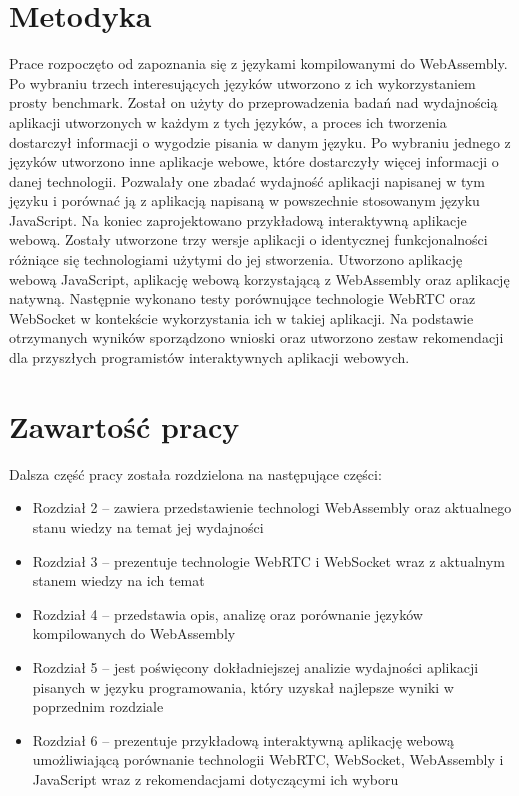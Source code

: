 \documentclass[language=polish,type=master]{aghmodern}
\begin{document}
\section{Metodyka}
Prace rozpoczęto od zapoznania się z językami kompilowanymi do WebAssembly.
Po wybraniu trzech interesujących języków utworzono z ich wykorzystaniem prosty benchmark.
Został on użyty do przeprowadzenia badań nad wydajnością aplikacji utworzonych w każdym z tych języków, a proces ich tworzenia dostarczył informacji o wygodzie pisania w danym języku.
Po wybraniu jednego z języków utworzono inne aplikacje webowe, które dostarczyły więcej informacji o danej technologii.
Pozwalały one zbadać wydajność aplikacji napisanej w tym języku i porównać ją z aplikacją napisaną w powszechnie stosowanym języku JavaScript.
Na koniec zaprojektowano przykładową interaktywną aplikacje webową.
Zostały utworzone trzy wersje aplikacji o identycznej funkcjonalności różniące się technologiami użytymi do jej stworzenia.
Utworzono aplikację webową JavaScript, aplikację webową korzystającą z WebAssembly oraz aplikację natywną.
Następnie wykonano testy porównujące technologie WebRTC oraz WebSocket w kontekście wykorzystania ich w takiej aplikacji.
Na podstawie otrzymanych wyników sporządzono wnioski oraz utworzono zestaw rekomendacji dla przyszłych programistów interaktywnych aplikacji webowych.

\section{Zawartość pracy}
Dalsza część pracy została rozdzielona na następujące części:

\begin{itemize}
    \item Rozdział 2 -- zawiera przedstawienie technologi WebAssembly oraz aktualnego stanu wiedzy na temat jej wydajności
    \item Rozdział 3 -- prezentuje technologie WebRTC i WebSocket wraz z aktualnym stanem wiedzy na ich temat
    \item Rozdział 4 -- przedstawia opis, analizę oraz porównanie języków kompilowanych do WebAssembly
    \item Rozdział 5 -- jest poświęcony dokładniejszej analizie wydajności aplikacji pisanych w języku programowania, który uzyskał najlepsze wyniki w poprzednim rozdziale
    \item Rozdział 6 -- prezentuje przykładową interaktywną aplikację webową umożliwiającą porównanie technologii WebRTC, WebSocket, WebAssembly i JavaScript wraz z rekomendacjami dotyczącymi ich wyboru
\end{itemize}
\end{document}
